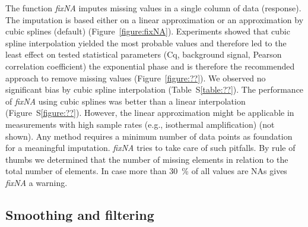 \documentclass[twocolumn]{bmcart}%
\begin{document}
  The function \textsl{fixNA} imputes missing values in a single column 
of data (response). The imputation is based either on a linear approximation or an 
approximation by cubic splines (default) (Figure~\ref{figure:fixNA}). 
Experiments showed that cubic spline interpolation yielded the most probable 
values and therefore led to the least effect on tested statistical parameters 
(Cq, background signal, Pearson correlation coefficient) the exponential phase 
and is therefore the recommended approach to remove missing values 
(Figure~\ref{figure:??}). We observed no significant bias by cubic spline 
interpolation (Table~S\ref{table:??}). The performance of \textsl{fixNA} using 
cubic splines was better than a linear interpolation (Figure~S\ref{figure:??}). 
However, the linear approximation might be applicable in measurements with high 
sample rates (e.g., isothermal amplification) (not shown). Any method requires a 
minimum number of data points as foundation for a meaningful imputation. 
\textsl{fixNA} tries to take care of such pitfalls. By rule of thumbs we 
determined that the number of missing elements in relation to the total number 
of elements. In case more than 30~\% of all values are NAs gives \textsl{fixNA} 
a warning.

\subsection*{Smoothing and filtering}
\end{document}
